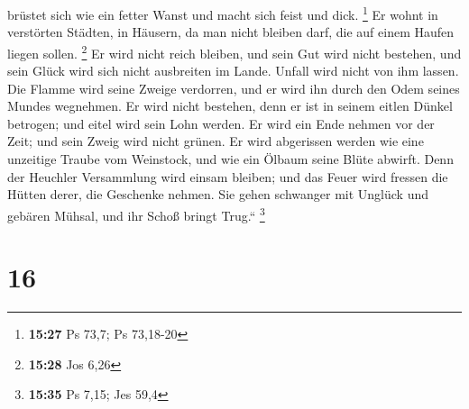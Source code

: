 brüstet sich wie ein fetter Wanst und macht sich feist und dick.
\footnote{\textbf{15:27} Ps 73,7; Ps 73,18-20}  Er wohnt in
verstörten Städten, in Häusern, da man nicht bleiben darf, die auf einem
Haufen liegen sollen. \footnote{\textbf{15:28} Jos 6,26} 
Er wird nicht reich bleiben, und sein Gut wird nicht bestehen, und sein
Glück wird sich nicht ausbreiten im Lande.  Unfall wird
nicht von ihm lassen. Die Flamme wird seine Zweige verdorren, und er
wird ihn durch den Odem seines Mundes wegnehmen.  Er wird
nicht bestehen, denn er ist in seinem eitlen Dünkel betrogen; und eitel
wird sein Lohn werden.  Er wird ein Ende nehmen vor der
Zeit; und sein Zweig wird nicht grünen.  Er wird abgerissen
werden wie eine unzeitige Traube vom Weinstock, und wie ein Ölbaum seine
Blüte abwirft.  Denn der Heuchler Versammlung wird einsam
bleiben; und das Feuer wird fressen die Hütten derer, die Geschenke
nehmen.  Sie gehen schwanger mit Unglück und gebären
Mühsal, und ihr Schoß bringt Trug.`` \footnote{\textbf{15:35} Ps 7,15;
  Jes 59,4}

\hypertarget{section-3}{%
\section{16}\label{section-3}}


